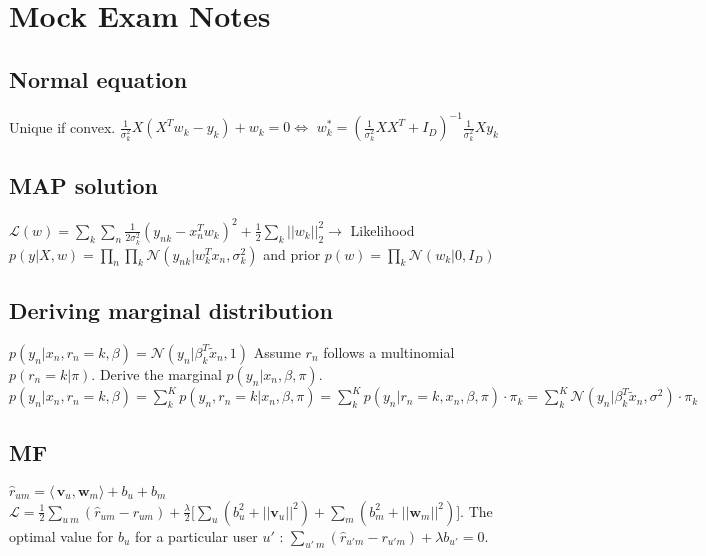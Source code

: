 \newline
\newline
\section{Mock Exam Notes}
\subsection{Normal equation}
Unique if convex.\newline
$\frac{1}{\sigma_k^2} X(X^Tw_k-y_k)+w_k = 0 \Leftrightarrow$ \newline
$ w_k^* = (\frac{1}{\sigma_k^2} XX^T+I_D)^{-1} \frac{1}{\sigma_k^2}Xy_k$

\subsection{MAP solution}
$\mathcal{L}(w) = \sum_k \sum_n \frac{1}{2\sigma_k^2} (y_{nk} - x_n^T w_k)^2 + \frac{1}{2} \sum_k ||w_k||^2_2 \rightarrow$
Likelihood $p(y|X,w) = \prod_n \prod_k \mathcal{N}(y_{nk}|w_k^Tx_n, \sigma_k^2)$ and prior $p(w) = \prod_k \mathcal{N}(w_k|0,I_D)$

\subsection{Deriving marginal distribution}
$p(y_n|x_n,r_n=k,\beta) = \mathcal{N} (y_n|\beta_k^T\tilde{x}_n,1)$
Assume $r_n$ follows a multinomial $p(r_n=k|\pi)$. Derive the marginal $p(y_n|x_n,\beta,\pi)$.
$p(y_n|x_n,r_n=k,\beta) = \sum_k^K p(y_n,r_n=k|x_n,\beta,\pi) = \sum_k^K p(y_n|r_n=k,x_n,\beta,\pi) \cdot \pi_k = \sum_k^K \mathcal{N}(y_n|\beta_k^T\tilde{x}_n, \sigma^2)\cdot \pi_k$

\subsection{MF}
$\hat{r}_{um} = \langle\,\mathbf{v}_u,\mathbf{w}_m\rangle + b_u + b_m$
$\mathcal{L} = \frac{1}{2} \sum_{u ~ m}(\hat{r}_{um} -r_{um}) + \frac{\lambda}{2} \big[
\sum_u (b_u^2+||\mathbf{v}_u||^2) + \sum_m (b_m^2+||\mathbf{w}_m||^2) \big]$. The optimal value for $b_u$ for a particular user $u'$ : $\sum_{u' ~ m} (\hat{r}_{u'm} - r_{u'm}) + \lambda b_{u'} = 0$.

